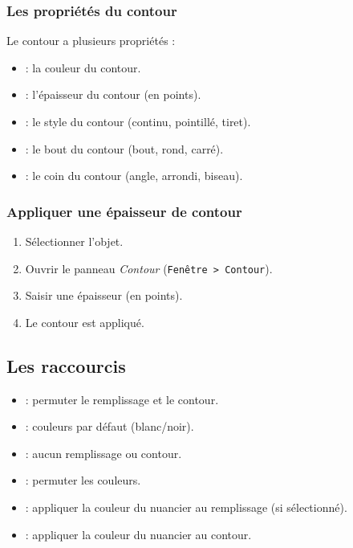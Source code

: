 \subsubsection{Les propriétés du contour}

Le contour a plusieurs propriétés :

\begin{itemize}
    \item {} : la couleur du contour.
    \item {} : l'épaisseur du contour (en points).
    \item {} : le style du contour (continu, pointillé, tiret).
    \item {} : le bout du contour (bout, rond, carré).
    \item {} : le coin du contour (angle, arrondi, biseau).
\end{itemize}

\subsubsection{Appliquer une épaisseur de contour}

\begin{enumerate}
    \item Sélectionner l'objet.
    \item Ouvrir le panneau \emph{Contour} (\texttt{Fenêtre > Contour}).
    \item Saisir une épaisseur (en points).
    \item Le contour est appliqué.
\end{enumerate}

\subsection{Les raccourcis}

\begin{itemize}
    \item {} : permuter le remplissage et le contour.
    \item {} : couleurs par défaut (blanc/noir).
    \item \terme{/} : aucun remplissage ou contour.
    \item {} : permuter les couleurs.
    \item \terme{<} : appliquer la couleur du nuancier au remplissage (si sélectionné).
    \item \terme{>} : appliquer la couleur du nuancier au contour.
\end{itemize}

